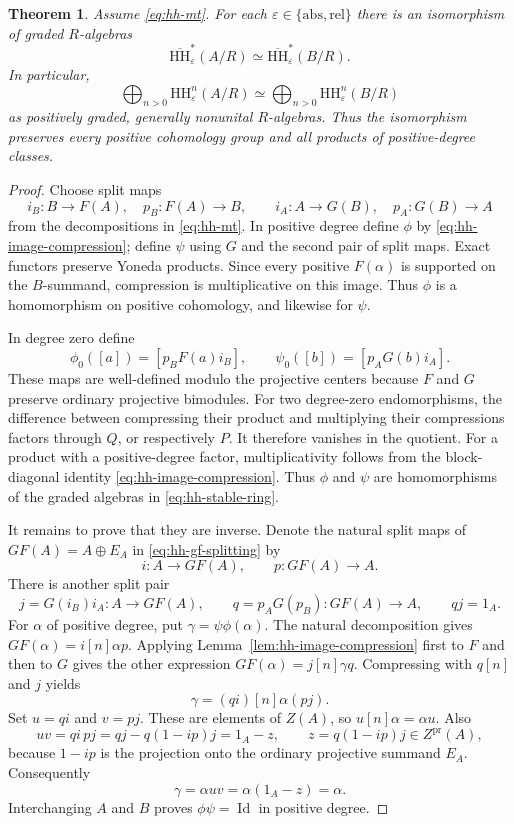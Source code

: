 \documentclass[12pt,a4paper,english,reqno]{amsart}
\numberwithin{equation}{section}
\theoremstyle{plain}
\newtheorem{theorem}{Theorem}[section]
\theoremstyle{definition}
\begin{document}
\begin{theorem}\label{thm:hh-cohomology-algebra}
Assume \eqref{eq:hh-mt}.  For each
$\varepsilon\in\{\mathrm{abs},\mathrm{rel}\}$ there is an
isomorphism of graded $R$-algebras
\[
 \overline{\mathrm{HH}}_{\varepsilon}^{*}(A/R)
       \simeq
 \overline{\mathrm{HH}}_{\varepsilon}^{*}(B/R).
\]
In particular,
\[
 \bigoplus_{n>0}\mathrm{HH}_{\varepsilon}^{n}(A/R)
       \simeq
 \bigoplus_{n>0}\mathrm{HH}_{\varepsilon}^{n}(B/R)
\]
as positively graded, generally nonunital $R$-algebras.  Thus the
isomorphism preserves every positive cohomology group and all products
of positive-degree classes.
\end{theorem}

\begin{proof}
Choose split maps
\[
 i_B:B\to F(A),\quad p_B:F(A)\to B,
 \qquad
 i_A:A\to G(B),\quad p_A:G(B)\to A
\]
from the decompositions in \eqref{eq:hh-mt}.  In positive degree
define $\phi$ by \eqref{eq:hh-image-compression}; define $\psi$
using $G$ and the second pair of split maps.  Exact functors
preserve Yoneda products.  Since every positive $F(\alpha)$ is
supported on the $B$-summand, compression is multiplicative on
this image.  Thus $\phi$ is a homomorphism on positive cohomology,
and likewise for $\psi$.

In degree zero define
\[
 \phi_0([a])=[p_BF(a)i_B],
 \qquad
 \psi_0([b])=[p_AG(b)i_A].
\]
These maps are well-defined modulo the projective centers because
$F$ and $G$ preserve ordinary projective bimodules.  For two
degree-zero endomorphisms, the difference between compressing
their product and multiplying their compressions factors through
$Q$, or respectively $P$.  It therefore vanishes in the quotient.
For a product with a positive-degree factor, multiplicativity
follows from the block-diagonal identity
\eqref{eq:hh-image-compression}.  Thus $\phi$ and $\psi$ are
homomorphisms of the graded algebras in
\eqref{eq:hh-stable-ring}.

It remains to prove that they are inverse.  Denote the natural
split maps of $GF(A)=A\oplus E_A$ in
\eqref{eq:hh-gf-splitting} by
\[
 i:A\longrightarrow GF(A),\qquad
 p:GF(A)\longrightarrow A.
\]
There is another split pair
\[
 j=G(i_B)i_A:A\longrightarrow GF(A),
 \qquad
 q=p_AG(p_B):GF(A)\longrightarrow A,
 \qquad qj=1_A.
\]
For $\alpha$ of positive degree, put
$\gamma=\psi\phi(\alpha)$.  The natural decomposition gives
$GF(\alpha)=i[n]\alpha p$.
Applying Lemma~\ref{lem:hh-image-compression} first to $F$ and
then to $G$ gives the other expression
$GF(\alpha)=j[n]\gamma q$.
Compressing with $q[n]$ and $j$ yields
\[
 \gamma=(qi)[n]\alpha(pj).
\]
Set $u=qi$ and $v=pj$.  These are elements of $Z(A)$, so
$u[n]\alpha=\alpha u$.  Also
\[
 uv=qi\,pj=qj-q(1-ip)j
          =1_A-z,
 \qquad z=q(1-ip)j\in Z^{\mathrm{pr}}(A),
\]
because $1-ip$ is the projection onto the ordinary projective
summand $E_A$.  Consequently
\[
 \gamma=\alpha uv=\alpha(1_A-z)=\alpha.
\]
Interchanging $A$ and $B$ proves $\phi\psi=\operatorname{Id}$
in positive degree.


\end{proof}
\end{document}
